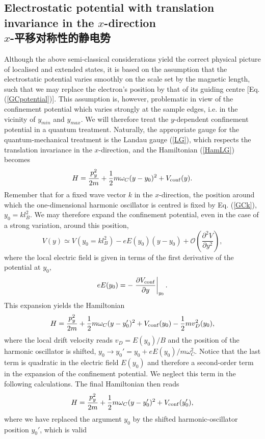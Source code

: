 \documentclass[10pt]{book}
\newcommand{\Omath}{\mathcal{O}}
\newcommand{\beq}{\begin{equation}}
\newcommand{\eeq}{\end{equation}}
\begin{document}
\subsection[$x$-平移对称性的静电势]{Electrostatic potential with translation invariance in the $x$-direction\\\bf $x$-平移对称性的静电势}
\label{secInv}

Although the above semi-classical considerations yield the correct physical picture of localised and extended states, 
it is based on the assumption that the electrostatic potential varies smoothly on the scale set by the magnetic length,
such that we may replace the electron's position by that of its guiding centre [Eq. (\ref{GCpotential})].
This assumption is, however, problematic in view of the confinement potential which varies strongly at the sample
edges, i.e. in the vicinity of $y_{min}$ and $y_{max}$. We will therefore treat the $y$-dependent confinement potential
in a quantum treatment. Naturally, the appropriate gauge for the quantum-mechanical treatment is the Landau gauge (\ref{LG}),
which respects the translation invariance in the $x$-direction, and the Hamiltonian (\ref{HamLG}) becomes 
\beq\label{HamLGconf}
H =  \frac{p_y^2}{2m} + \frac{1}{2} m\omega_C (y-y_0)^2 + V_{\rm conf}(y).
\eeq
Remember that for a fixed wave vector $k$ in the $x$-direction, the position around which the one-dimensional harmonic
oscillator is centred is fixed by Eq. (\ref{GCk}), $y_0=kl_B^2$. We may therefore expand the confinement potential, even in the case 
of a strong variation, around this position,
$$V(y)\simeq V(y_0=kl_B^2) - eE(y_0)(y-y_0) + \Omath\left(\frac{\partial^2 V}{\partial y^2}\right),$$
where the local electric field is given in terms of the first derivative of the potential at $y_0$,
$$eE(y_0) = -\left. \frac{\partial V_{\rm conf}}{\partial y}\right|_{y_0} .$$
This expansion yields the Hamiltonian
$$
H =  \frac{p_y^2}{2m} + \frac{1}{2} m\omega_C (y-y_0')^2 + V_{\rm conf}(y_0) - \frac{1}{2}m v_D^2(y_0),
$$
where the local drift velocity reads $v_D=E(y_0)/B$ and the position of the harmonic oscillator is shifted,
$y_0\to y_0'=y_0 + eE(y_0)/m\omega_C^2$. Notice that the last term is quadratic in the 
electric field $E(y_0)$ and therefore a second-order term in the expansion of the confinement potential. We
neglect this term in the following calculations. The final Hamiltonian then reads
\beq\label{HamLGconf2}
H =  \frac{p_y^2}{2m} + \frac{1}{2} m\omega_C (y-y_0')^2 + V_{\rm conf}(y_0'),
\eeq
where we have replaced the argument $y_0$ by the shifted harmonic-oscillator position $y_0'$, which is valid
\end{document}
